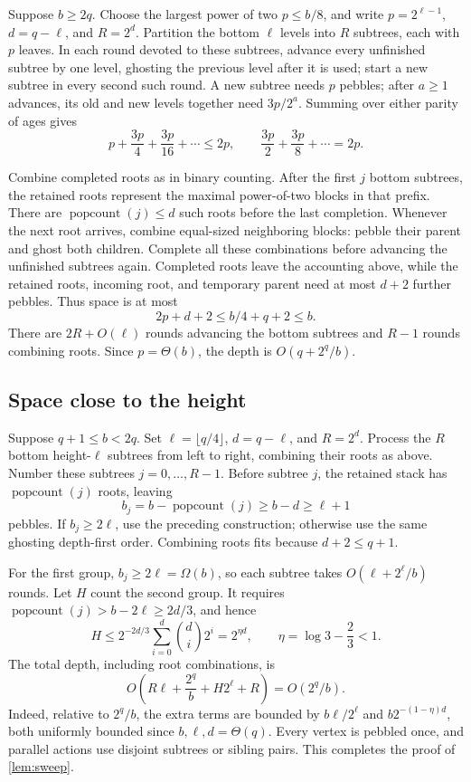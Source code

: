 \documentclass[11pt]{article}
\theoremstyle{definition}
\theoremstyle{remark}
\DeclareMathOperator{\popcount}{popcount}
\begin{document}
Suppose $b\ge2q$. Choose the largest power of two $p\le b/8$, and write $p=2^{\ell-1}$, $d=q-\ell$, and $R=2^d$. Partition the bottom $\ell$ levels into $R$ subtrees, each with $p$ leaves. In each round devoted to these subtrees, advance every unfinished subtree by one level, ghosting the previous level after it is used; start a new subtree in every second such round. A new subtree needs $p$ pebbles; after $a\ge1$ advances, its old and new levels together need $3p/2^a$. Summing over either parity of ages gives
\[
p+\frac{3p}{4}+\frac{3p}{16}+\cdots\le2p, \qquad \frac{3p}{2}+\frac{3p}{8}+\cdots=2p.
\]

Combine completed roots as in binary counting. After the first $j$ bottom subtrees, the retained roots represent the maximal power-of-two blocks in that prefix. There are $\popcount(j)\le d$ such roots before the last completion. Whenever the next root arrives, combine equal-sized neighboring blocks: pebble their parent and ghost both children. Complete all these combinations before advancing the unfinished subtrees again. Completed roots leave the accounting above, while the retained roots, incoming root, and temporary parent need at most $d+2$ further pebbles. Thus space is at most
\[
2p+d+2\le b/4+q+2\le b.
\]
There are $2R+O(\ell)$ rounds advancing the bottom subtrees and $R-1$ rounds combining roots. Since $p=\Theta(b)$, the depth is $O(q+2^q/b)$.

\subsection{Space close to the height}

Suppose $q+1\le b<2q$. Set $\ell=\lfloor q/4\rfloor$, $d=q-\ell$, and $R=2^d$. Process the $R$ bottom height-$\ell$ subtrees from left to right, combining their roots as above. Number these subtrees $j=0,\ldots,R-1$. Before subtree $j$, the retained stack has $\popcount(j)$ roots, leaving
\[
b_j=b-\popcount(j)\ge b-d\ge\ell+1
\]
pebbles. If $b_j\ge2\ell$, use the preceding construction; otherwise use the same ghosting depth-first order. Combining roots fits because $d+2\le q+1$.

For the first group, $b_j\ge2\ell=\Omega(b)$, so each subtree takes $O(\ell+2^\ell/b)$ rounds. Let $H$ count the second group. It requires $\popcount(j)>b-2\ell\ge2d/3$, and hence
\[
H\le2^{-2d/3}\sum_{i=0}^d\binom di2^i=2^{\eta d}, \qquad \eta=\log3-\frac23<1.
\]
The total depth, including root combinations, is
\[
O\!\left(R\ell+\frac{2^q}{b}+H2^\ell+R\right)=O(2^q/b).
\]
Indeed, relative to $2^q/b$, the extra terms are bounded by $b\ell/2^\ell$ and $b2^{-(1-\eta)d}$, both uniformly bounded since $b,\ell,d=\Theta(q)$. Every vertex is pebbled once, and parallel actions use disjoint subtrees or sibling pairs. This completes the proof of \cref{lem:sweep}.
\end{document}
